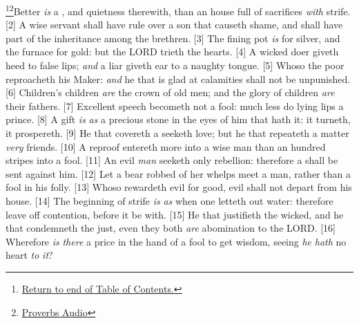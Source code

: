 \footnote{\textcolor[cmyk]{0.99998,1,0,0}{\hyperlink{TOC}{Return to end of Table of Contents.}}}\footnote{\href{https://audiobible.com/bible/proverbs_17.html}{\textcolor[cmyk]{0.99998,1,0,0}{Proverbs Audio}}}\textcolor[cmyk]{0.99998,1,0,0}{Better \emph{is} a , and quietness therewith, than an house full of sacrifices \emph{with} strife.}
[2] \textcolor[cmyk]{0.99998,1,0,0}{A wise servant shall have rule over a son that causeth shame, and shall have part of the inheritance among the brethren.}
[3] \textcolor[cmyk]{0.99998,1,0,0}{The fining pot \emph{is} for silver, and the furnace for gold: but the LORD trieth the hearts.}
[4] \textcolor[cmyk]{0.99998,1,0,0}{A wicked doer giveth heed to false lips; \emph{and} a liar giveth ear to a naughty tongue.}
[5] \textcolor[cmyk]{0.99998,1,0,0}{Whoso  the poor reproacheth his Maker: \emph{and} he that is glad at calamities shall not be unpunished.}
[6] \textcolor[cmyk]{0.99998,1,0,0}{Children's children \emph{are} the crown of old men; and the glory of children \emph{are} their fathers.}
[7] \textcolor[cmyk]{0.99998,1,0,0}{Excellent speech becometh not a fool: much less do lying lips a prince.}
[8] \textcolor[cmyk]{0.99998,1,0,0}{A gift \emph{is} \emph{as} a precious stone in the eyes of him that hath it:  it turneth, it prospereth.}
[9] \textcolor[cmyk]{0.99998,1,0,0}{He that covereth a  seeketh love; but he that repeateth a matter  \emph{very} friends.}
[10] \textcolor[cmyk]{0.99998,1,0,0}{A reproof entereth more into a wise man than an hundred stripes into a fool.}
[11] \textcolor[cmyk]{0.99998,1,0,0}{An evil \emph{man} seeketh only rebellion: therefore a  shall be sent against him.}
[12] \textcolor[cmyk]{0.99998,1,0,0}{Let a bear robbed of her whelps meet a man, rather than a fool in his folly.}
[13] \textcolor[cmyk]{0.99998,1,0,0}{Whoso rewardeth evil for good, evil shall not depart from his house.}
[14] \textcolor[cmyk]{0.99998,1,0,0}{The beginning of strife \emph{is} \emph{as} when one letteth out water: therefore leave off contention, before it be  with.}
[15] \textcolor[cmyk]{0.99998,1,0,0}{He that justifieth the wicked, and he that condemneth the just, even they both \emph{are} abomination to the LORD.}
[16] \textcolor[cmyk]{0.99998,1,0,0}{Wherefore \emph{is} \emph{there} a price in the hand of a fool to get wisdom, seeing \emph{he} \emph{hath} no heart \emph{to} \emph{it}?}
